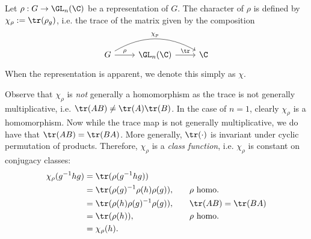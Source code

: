 \begin{dfn}[Character]
Let $\rho: G \to \GL_n(\C)$ be a representation of $G$. The character of $\rho$ is defined by $\chi_\rho:= \tr(\rho_g)$, i.e. the trace of the matrix given by the composition
	\[
	\begin{tikzcd}
	G \arrow{r}{\rho} \arrow[bend left]{rr}{\chi_p} & \GL_n(\C)  \arrow{r}{\tr} & \C 
	\end{tikzcd}
	\]
When the representation is apparent, we denote this simply as $\chi$.
\end{dfn}


Observe that $\chi_\rho$ is \emph{not} generally a homomorphism as the trace is not generally multiplicative, i.e. $\tr(AB) \neq \tr(A)\tr(B)$. In the case of $n=1$, clearly $\chi_\rho$ is a homomorphism. Now while the trace map is not generally multiplicative, we do have that $\tr(AB)=\tr(BA)$. More generally, $\tr(\cdot)$ is invariant under cyclic permutation of products. Therefore, $\chi_\rho$ is a \emph{class function}, i.e. $\chi_\rho$ is constant on conjugacy classes:
	\[
	\begin{aligned}
	\chi_\rho(g^{-1}hg)&= \tr(\rho(g^{-1}hg)) &&&& \\
	&=\tr(\rho(g)^{-1}\rho(h)\rho(g)), &&&& \rho \text{ homo.} \\
	&=\tr(\rho(h)\rho(g)^{-1}\rho(g)), &&&& \tr(AB)=\tr(BA) \\
	&= \tr(\rho(h)), &&&& \rho \text{ homo.} \\
	&=\chi_\rho(h).
	\end{aligned}
	\]


